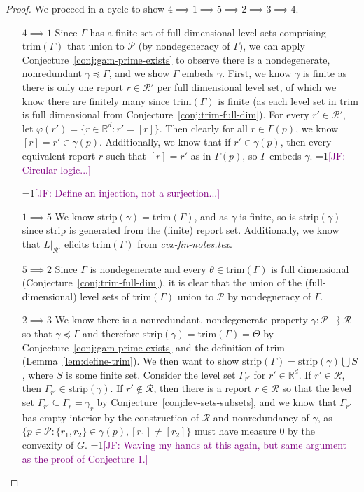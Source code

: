 \documentclass[12pt]{article}
\newcommand{\Comments}{1}
\newcommand{\mynote}[2]{\ifnum\Comments=1\textcolor{#1}{#2}\fi}
\newcommand{\jessie}[1]{\mynote{purple}{[JF: #1]}}
\newcommand{\reals}{\mathbb{R}}
\renewcommand{\P}{\mathcal{P}}
\newcommand{\R}{\mathcal{R}}
\newcommand{\toto}{\rightrightarrows}
\newcommand{\trim}{\mathrm{trim}}
\newcommand{\strip}{\mathrm{strip}}
\begin{document}
\begin{proof}
We proceed in a cycle to show $4 \implies 1 \implies 5 \implies 2 \implies 3 \implies 4$.

\begin{enumerate}


\item[$4 \implies 1$] 
Since $\Gamma$ has a finite set of full-dimensional level sets comprising $\trim(\Gamma)$ that union to $\P$ (by nondegeneracy of $\Gamma$), we can apply Conjecture~\ref{conj:gam-prime-exists} to observe there is a nondegenerate, nonredundant $\gamma \preceq \Gamma$, and we show $\Gamma$ embeds $\gamma$.
First, we know $\gamma$ is finite as there is only one report $r \in \R'$ per full dimensional level set, of which we know there are finitely many since $\trim(\Gamma)$ is finite (as each level set in $\trim$ is full dimensional from Conjecture~\ref{conj:trim-full-dim}).
For every $r' \in \R'$, let $\varphi(r') = \{ r\in\reals^d : r' = [r] \}$.
Then clearly for all $r \in \Gamma(p)$, we know $[r] = r' \in \gamma(p)$.
Additionally, we know that if $r' \in \gamma(p)$, then every equivalent report $r$ such that $[r] = r'$ as in $\Gamma(p)$, so $\Gamma$ embeds $\gamma$.
\jessie{Circular logic...}

\jessie{Define an injection, not a surjection...}

\item [$1 \implies 5$]
We know $\strip(\gamma) = \trim(\Gamma)$, and as $\gamma$ is finite, so is $\strip(\gamma)$ since strip is generated from the (finite) report set.
Additionally, we know that $L|_{\R'}$ elicits $\trim(\Gamma)$ from \emph{cvx-fin-notes.tex}.

\item [$5 \implies 2$]
Since $\Gamma$ is nondegenerate and every $\theta \in \trim(\Gamma)$ is full dimensional (Conjecture~\ref{conj:trim-full-dim}), it is clear that the union of the (full-dimensional) level sets of $\trim(\Gamma)$ union to $\P$ by nondegneracy of $\Gamma$.


\item [$2 \implies 3$]
	We know there is a nonredundant, nondegenerate property $\gamma : \P \toto \R$ so that $\gamma \preceq \Gamma$ and therefore $\strip(\gamma) = \trim(\Gamma) = \Theta$ by Conjecture~\ref{conj:gam-prime-exists} and the definition of trim (Lemma~\ref{lem:define-trim}).
	We then want to show $\strip(\Gamma) = \strip(\gamma) \bigcup S$, where $S$ is some finite set.
	Consider the level set $\Gamma_{r'}$ for $r' \in \reals^d$.
	If $r' \in \R$, then $\Gamma_{r'} \in \strip(\gamma)$.
	If $r' \not \in \R$, then there is a report $r \in \R$ so that the level set $\Gamma_{r'} \subseteq \Gamma_r = \gamma_r$ by Conjecture~\ref{conj:lev-sets-subsets}, and we know that $\Gamma_{r'}$ has empty interior by the construction of $\R$ and nonredundancy of $\gamma$, as $\{p \in \P: \{r_1, r_2\} \in \gamma(p), [r_1] \neq [r_2] \}$ must have measure $0$ by the convexity of $G$.
	\jessie{Waving my hands at this again, but same argument as the proof of Conjecture 1.}


\end{enumerate}
\end{proof}
\end{document}
